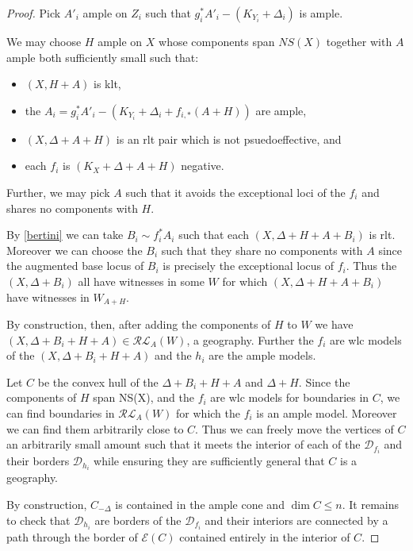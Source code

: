 \documentclass[a4paper,12pt]{amsart}
\begin{document}
\begin{proof}

	Pick $A'_{i}$ ample on $Z_{i}$ such that $g_{i}^{*}A'_{i}-(K_{Y_{i}}+\Delta_{i})$ is ample. 
	
	We may choose $H$ ample on $X$ whose components span $NS(X)$ together with $A$ ample both sufficiently small such that:
	\begin{itemize}
		\item $(X,H+A)$ is klt,
		\item the $A_{i} = g_{i}^{*}A'_{i}-(K_{Y_{i}}+\Delta_{i}+f_{i,*}(A+H))$ are ample,
		\item $(X,\Delta+A+H)$ is an rlt pair which is not psuedoeffective, and
		\item each $f_{i}$ is $(K_{X}+\Delta+A+H)$ negative.
	\end{itemize}

	Further, we may pick $A$ such that it avoids the exceptional loci of the $f_{i}$ and shares no components with $H$.
	
	By \autoref{bertini} we can take $B_{i} \sim f_{i}^{*}A_{i}$ such that each $(X,\Delta+H+A+B_{i})$ is rlt. Moreover we can choose the $B_{i}$ such that they share no components with $A$ since the augmented base locus of $B_{i}$ is precisely the exceptional locus of $f_{i}$. Thus the $(X,\Delta+B_{i})$ all have witnesses in some $W$ for which $(X,\Delta+H+A+B_{i})$ have witnesses in $W_{A+H}$.
	
	By construction, then, after adding the components of $H$ to $W$ we have $(X,\Delta+B_{i}+H+A) \in \mathcal{RL}_{A}(W)$, a geography. Further the $f_{i}$ are wlc models of the $(X,\Delta+B_{i}+H+A)$ and the $h_{i}$ are the ample models.
	
	Let $C$ be the convex hull of the $\Delta+B_{i}+H+A$ and $\Delta+H$. Since the components of $H$ span NS(X), and the $f_{i}$ are wlc models for boundaries in $C$, we can find boundaries in $\mathcal{RL}_{A}(W)$ for which the $f_{i}$ is an ample model. Moreover we can find them arbitrarily close to $C$. Thus we can freely move the vertices of $C$ an arbitrarily small amount such that it meets the interior of each of the $\mathcal{D}_{f_{i}}$ and their borders $\mathcal{D}_{h_{i}}$ while ensuring they are sufficiently general that $C$ is a geography. 
	
	By construction, $C_{-\Delta}$ is contained in the ample cone and $\dim C \leq n$. It remains to check that $\mathcal{D}_{h_{i}}$ are borders of the $\mathcal{D}_{f_{i}}$ and their interiors are connected by a path through the border of $\mathcal{E}(C)$ contained entirely in the interior of $C$.
	

\end{proof}
\end{document}
